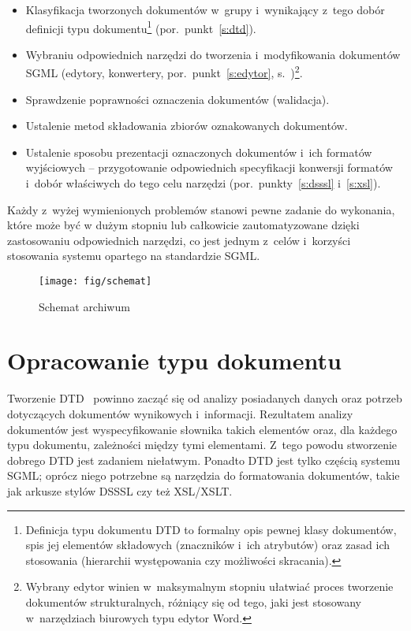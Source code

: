 \documentclass[brudnopis]{xmgr}
\begin{document}
\begin{itemize}
\item Klasyfikacja tworzonych dokumentów w~grupy i~wynikający z~tego
  dobór definicji typu dokumentu\footnote{Definicja typu dokumentu DTD
    to formalny opis pewnej klasy dokumentów, spis jej elementów
    składowych (znaczników i~ich atrybutów) oraz zasad ich stosowania
    (hierarchii występowania czy możliwości skracania).}
  (por.~punkt~\ref{s:dtd}).
\item Wybraniu odpowiednich narzędzi do tworzenia i~modyfikowania
  dokumentów SGML (edytory, konwertery, por.~punkt~\ref{s:edytor},
  s.~\pageref{s:edytor})\footnote{Wybrany edytor winien w~maksymalnym
    stopniu ułatwiać proces tworzenie dokumentów strukturalnych,
    różniący się od tego, jaki jest stosowany w~narzędziach biurowych
    typu edytor Word.}.
\item Sprawdzenie poprawności oznaczenia dokumentów
  (walidacja).
\item Ustalenie metod składowania zbiorów oznakowanych dokumentów.
\item Ustalenie sposobu prezentacji oznaczonych dokumentów i~ich
  formatów wyjściowych -- przygotowanie odpowiednich specyfikacji
  konwersji formatów i~dobór właściwych do tego celu narzędzi
  (por.~punkty~\ref{s:dsssl} i~\ref{s:xsl}).
\end{itemize}

Każdy z~wyżej wymienionych problemów stanowi pewne zadanie do
wykonania, które może być w dużym stopniu lub całkowicie
zautomatyzowane dzięki zastosowaniu odpowiednich narzędzi, co jest
jednym z~celów i~korzyści stosowania systemu opartego na standardzie
SGML.

\begin{figure}[!tbh]
\centering
\texttt{[image: fig/schemat]}
\caption{Schemat archiwum\label{RYS.2}}
\end{figure}

\section{Opracowanie typu dokumentu\label{s:dtd}}
Tworzenie DTD~\cite{Eisenberg:2002:SXM,Goldfarb:2002:CFG} powinno zacząć się
od analizy posiadanych danych oraz potrzeb dotyczących dokumentów
wynikowych i~informacji. Rezultatem analizy dokumentów jest
wyspecyfikowanie słownika takich elementów oraz, dla każdego typu
dokumentu, zależności między tymi elementami. Z~tego powodu stworzenie
dobrego DTD jest zadaniem niełatwym. Ponadto DTD jest tylko częścią
systemu SGML; oprócz niego potrzebne są narzędzia do formatowania
dokumentów, takie jak arkusze stylów DSSSL czy też XSL/XSLT.
\end{document}
